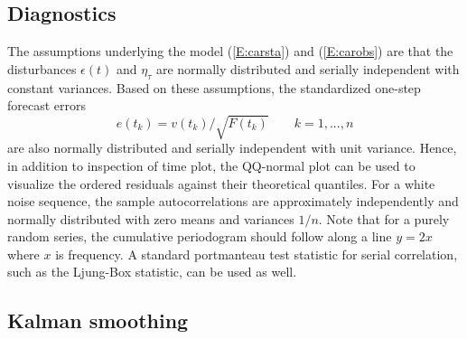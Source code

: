 \subsection{Diagnostics}\label{S:cardiag}

The assumptions underlying the model (\ref{E:carsta}) and (\ref{E:carobs}) are that the disturbances $\epsilon(t)$ and $\eta_{\tau}$ are normally distributed and serially independent with constant variances. Based on these assumptions, the standardized one-step forecast errors
\begin{equation}
e(t_k)=v(t_k)/\sqrt{F(t_k)} \qquad k=1,...,n
\end{equation}
are also normally distributed and serially independent with unit variance. Hence, in addition to inspection of time plot, the QQ-normal plot can be used to visualize the ordered residuals against their theoretical quantiles. For a
white noise sequence, the sample autocorrelations are approximately independently
and normally distributed with zero means and variances $1/n$. Note that for a purely random series, the cumulative periodogram should follow along a line $y=2x$ where $x$ is frequency. 
A standard portmanteau test statistic for serial correlation, such as the Ljung-Box statistic, can be used as well.

\subsection{Kalman smoothing}\label{S:carsmo}

